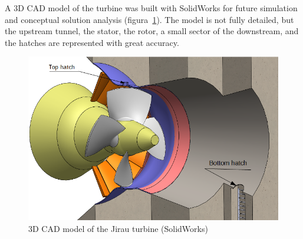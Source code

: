 A 3D CAD model of the turbine was built with SolidWorks for future simulation
and conceptual solution analysis (figura~\ref{fig::ambiente3d}). The model is
not fully detailed, but the upstream tunnel, the stator, the rotor, a small
sector of the downstream, and the hatches are represented with great accuracy.

\begin{figure}[h!]
\centering
	\includegraphics[width=\columnwidth]{figs/estudo/solid/ambiente_3d} 
	\caption{3D CAD model of the Jirau turbine (SolidWorks)}
	\label{fig::ambiente3d}
\end{figure}




